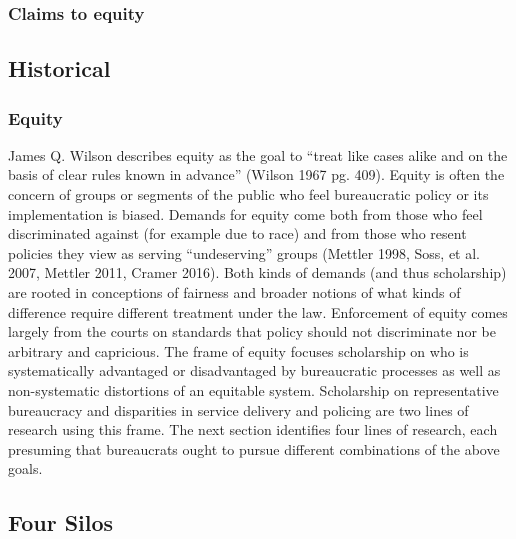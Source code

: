 \subsubsection{Claims to equity}
\subsection{Historical}

\subsubsection{Equity}

James Q. Wilson describes equity as the goal to ``treat like cases alike and on the basis of clear rules known in advance'' (Wilson 1967 pg. 409). Equity is often the concern of groups or segments of the public who feel bureaucratic policy or its implementation is biased. Demands for equity come both from those who feel discriminated against (for example due to race) and from those who resent policies they view as serving ``undeserving'' groups (Mettler 1998, Soss, et al. 2007, Mettler 2011, Cramer 2016). Both kinds of demands (and thus scholarship) are rooted in conceptions of fairness and broader notions of what kinds of difference require different treatment under the law. Enforcement of equity comes largely from the courts on standards that policy should not discriminate nor be arbitrary and capricious. 
The frame of equity focuses scholarship on who is systematically advantaged or disadvantaged by bureaucratic processes as well as non-systematic distortions of an equitable system. Scholarship on representative bureaucracy and disparities in service delivery and policing are two lines of research using this frame.
The next section identifies four lines of research, each presuming that bureaucrats ought to pursue different combinations of the above goals. 

\subsection{Four Silos}


